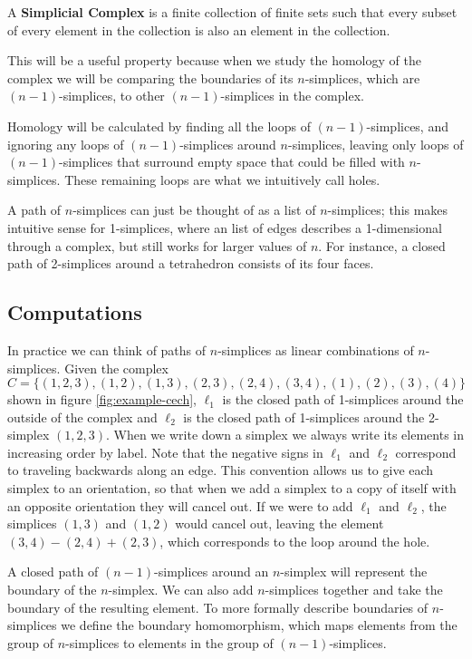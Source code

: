 \begin{definition}\label{def:simplicial-complex}
    A \textbf{Simplicial Complex} is a finite collection of finite sets such that every subset of every element in the collection is also an element in the collection. \cite{wagner}
\end{definition}

This will be a useful property because when we study the homology of the complex we will be comparing the boundaries of its \(n\)-simplices, which are \((n-1)\)-simplices, to other \((n-1)\)-simplices in the complex.

Homology will be calculated by finding all the loops of \((n-1)\)-simplices, and ignoring any loops of \((n-1)\)-simplices around \(n\)-simplices, leaving only loops of \((n-1)\)-simplices that surround empty space that could be filled with \(n\)-simplices.
These remaining loops are what we intuitively call holes.

A path of \(n\)-simplices can just be thought of as a list of \(n\)-simplices; this makes intuitive sense for 1-simplices, where an list of edges describes a 1-dimensional through a complex, but still works for larger values of \(n\).
For instance, a closed path of 2-simplices around a tetrahedron consists of its four faces.

\subsection{Computations}

In practice we can think of paths of \(n\)-simplices as linear combinations of \(n\)-simplices.
Given the complex \(C = \{ (1,2,3), (1,2), (1,3), (2,3), (2,4), (3,4), (1), (2), (3), (4) \}\) shown in figure \ref{fig:example-cech}, \(\ell_1\) is the closed path of 1-simplices around the outside of the complex and \(\ell_2\) is the closed path of 1-simplices around the 2-simplex \((1,2,3)\).
When we write down a simplex we always write its elements in increasing order by label.
Note that the negative signs in \(\ell_1\) and \(\ell_2\) correspond to traveling backwards along an edge.
This convention allows us to give each simplex to an orientation, so that when we add a simplex to a copy of itself with an opposite orientation they will cancel out.
If we were to add \(\ell_1\) and \(\ell_2\), the simplices \((1, 3)\) and \((1, 2)\) would cancel out, leaving the element \((3, 4) - (2, 4) + (2, 3)\), which corresponds to the loop around the hole.

A closed path of \((n-1)\)-simplices around an \(n\)-simplex will represent the boundary of the \(n\)-simplex. We can also add \(n\)-simplices together and take the boundary of the resulting element. To more formally describe boundaries of \(n\)-simplices we define the boundary homomorphism, which maps elements from the group of \(n\)-simplices to elements in the group of \((n-1)\)-simplices.

